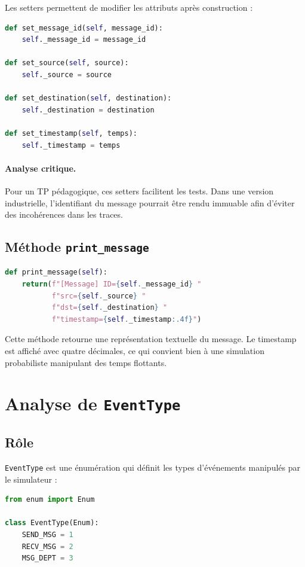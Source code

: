 \documentclass{article}
\begin{document}
Les setters permettent de modifier les attributs après construction :

\begin{lstlisting}[language=Python, caption=Setters de MessageImpl]
def set_message_id(self, message_id):
    self._message_id = message_id

def set_source(self, source):
    self._source = source

def set_destination(self, destination):
    self._destination = destination

def set_timestamp(self, temps):
    self._timestamp = temps
\end{lstlisting}

\paragraph{Analyse critique.}
Pour un TP pédagogique, ces setters facilitent les tests. Dans une version industrielle, l’identifiant du message pourrait être rendu immuable afin d’éviter des incohérences dans les traces.

\subsection{Méthode \texttt{print\_message}}

\begin{lstlisting}[language=Python]
def print_message(self):
    return(f"[Message] ID={self._message_id} "
           f"src={self._source} "
           f"dst={self._destination} "
           f"timestamp={self._timestamp:.4f}")
\end{lstlisting}

Cette méthode retourne une représentation textuelle du message. Le timestamp est affiché avec quatre décimales, ce qui convient bien à une simulation probabiliste manipulant des temps flottants.

\section{Analyse de \texttt{EventType}}

\subsection{Rôle}

\texttt{EventType} est une énumération qui définit les types d’événements manipulés par le simulateur :

\begin{lstlisting}[language=Python, caption=EventType.py]
from enum import Enum

class EventType(Enum):
    SEND_MSG = 1
    RECV_MSG = 2
    MSG_DEPT = 3
\end{lstlisting}
\end{document}

